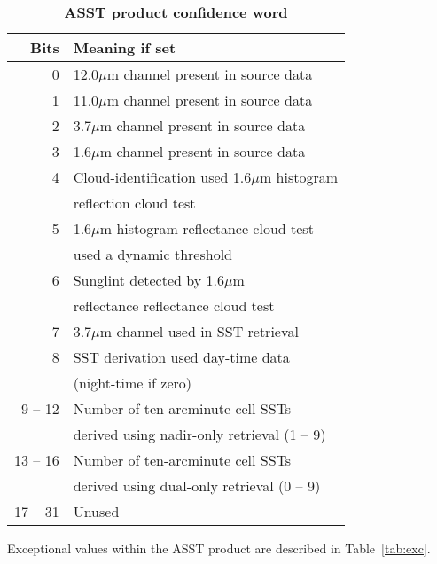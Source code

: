 \begin{table}
\caption{\bf ASST product confidence word}
\label{tab:con}
\begin{center}
\begin{tabular}{|r|l|} \hline

{\bf Bits } & {\bf Meaning if set}                          \\ \hline \hline
0           & 12.0$\mu$m channel present in source data     \\ \hline
1           & 11.0$\mu$m channel present in source data     \\ \hline
2           & 3.7$\mu$m channel present in source data      \\ \hline
3           & 1.6$\mu$m channel present in source data      \\ \hline
4           & Cloud-identification used 1.6$\mu$m histogram \\
            & reflection cloud test                         \\ \hline
5           & 1.6$\mu$m histogram reflectance cloud test    \\
            & used a dynamic threshold                      \\ \hline
6           & Sunglint detected by 1.6$\mu$m                \\
            & reflectance reflectance cloud test            \\ \hline
7           & 3.7$\mu$m channel used in SST retrieval       \\ \hline
8           & SST derivation used day-time data             \\
            & (night-time if zero)                          \\ \hline
9 -- 12     & Number of ten-arcminute cell SSTs             \\
            & derived using nadir-only retrieval (1 -- 9)   \\ \hline
13 -- 16    & Number of ten-arcminute cell SSTs             \\
            & derived using dual-only retrieval (0 -- 9)    \\ \hline
17 -- 31    & Unused                                        \\ \hline
\end{tabular}
\end{center}
\end{table}


Exceptional values within the ASST product are described in 
Table~\ref{tab:exc}. 

